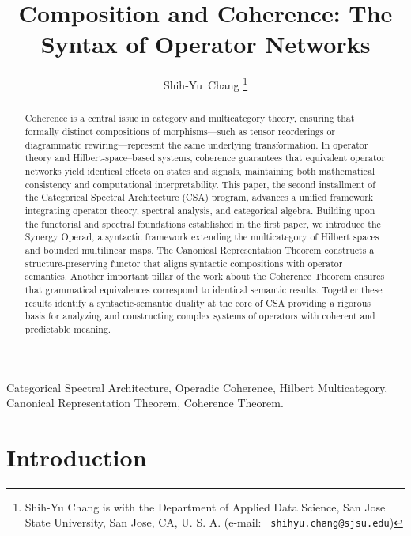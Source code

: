 \documentclass[11pt]{article}
\begin{document}
\vspace{1cm}
\title{Composition and Coherence: The Syntax of Operator Networks}
\vspace{1.8cm}
\author{Shih-Yu~Chang
\thanks{Shih-Yu Chang is with the Department of Applied Data Science,
San Jose State University, San Jose, CA, U. S. A. (e-mail: {\tt
shihyu.chang@sjsu.edu})
}}

\maketitle

\begin{abstract}
%
Coherence is a central issue in category and multicategory theory, ensuring that formally distinct compositions of morphisms—such as tensor reorderings or diagrammatic rewiring—represent the same underlying transformation. In operator theory and Hilbert-space–based systems, coherence guarantees that equivalent operator networks yield identical effects on states and signals, maintaining both mathematical consistency and computational interpretability. This paper, the second installment of the Categorical Spectral Architecture (CSA) program, advances a unified framework integrating operator theory, spectral analysis, and categorical algebra. Building upon the functorial and spectral foundations established in the first paper, we introduce the Synergy Operad, a syntactic framework extending the multicategory of Hilbert spaces and bounded multilinear maps. The Canonical Representation Theorem constructs a structure-preserving functor that aligns syntactic compositions with operator semantics. Another important pillar of the work about the Coherence Theorem ensures that grammatical equivalences correspond to identical semantic results. Together these results identify a syntactic-semantic duality at the core of CSA providing a rigorous basis for analyzing and constructing complex systems of operators with coherent and predictable meaning.
%
\end{abstract}
%
\begin{keywords}
Categorical Spectral Architecture, Operadic Coherence, Hilbert Multicategory, Canonical Representation Theorem, Coherence Theorem.
\end{keywords}



\section{Introduction}\label{sec:Introduction}
\end{document}
